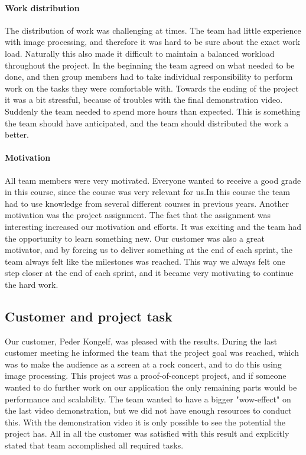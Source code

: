 \paragraph{Work distribution}
The distribution of work was challenging at times. 
The team had little experience with image processing, and therefore it was hard to be sure about the exact work load. Naturally this also made it difficult to maintain a balanced workload throughout the project. 
In the beginning the team agreed on what needed to be done, and then group members had to take individual responsibility to perform work on the tasks they were comfortable with. 
Towards the ending of the project it was a bit stressful, because of troubles with the final demonstration video. Suddenly the team needed to spend more hours than expected. This is something the team should have anticipated, and the team should distributed the work a better.

\paragraph{Motivation}
All team members were very motivated. Everyone wanted to receive a good grade in this course, since the course was very relevant for us.In this course the team had to use knowledge from several different courses in previous years. Another motivation was the project assignment. The fact that the assignment was interesting increased our motivation and efforts. It was exciting and the team had the opportunity to learn something new. Our customer was also a great motivator, and by forcing us to deliver something at the end of each sprint, the team always felt like the milestones was reached. This way we always felt one step closer at the end of each sprint, and it became very motivating to continue the hard work. 

\subsection{Customer and project task} \label{txt:evaluation_customerandprojecttask}
Our customer, Peder Kongelf, was pleased with the results. During the last customer meeting he informed the team that the project goal was reached, which was to make the audience as a screen at a rock concert, and to do this using image processing.
This project was a proof-of-concept project, and if someone wanted to do further work on our application the only remaining parts would be performance and scalability. 
The team wanted to have a bigger "wow-effect" on the last video demonstration, but we did not have enough resources to conduct this. With the demonstration video it is only possible to see the potential the project has. All in all the customer was satisfied with this result and explicitly stated that team accomplished all required tasks. 

